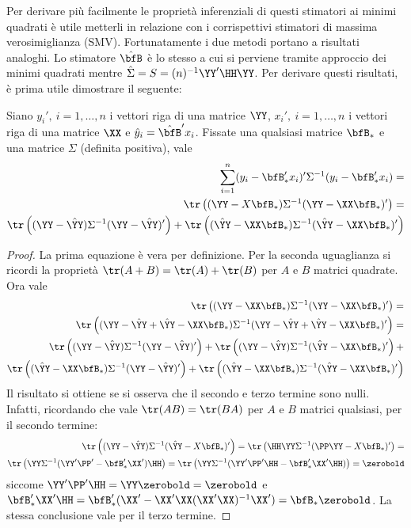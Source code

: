 \documentclass[]{article}
\begin{document}
Per derivare più facilmente le proprietà inferenziali di questi
stimatori ai minimi quadrati è utile metterli in relazione con i
corrispettivi stimatori di massima verosimiglianza (SMV). Fortunatamente
i due metodi portano a risultati analoghi. Lo stimatore \(\hat{\bfB}\) è
lo stesso a cui si perviene tramite approccio dei minimi quadrati mentre
\(\hat{\Sigma}=S=(n)^{-1}\YY'\HH\YY\). Per derivare questi risultati, è
prima utile dimostrare il seguente:

\begin{lemma}\label{decoScarti}
Siano $y_i',\ i=1,\ldots,n$ i vettori riga di una matrice $\YY$, $x_i',\ i=1,\ldots,n$ i vettori riga di una matrice $\XX$  e ${\hat y}_i=\hat{\bfB}'x_i$. Fissate una qualsiasi matrice $\bfB_*$ e una matrice $\Sigma$ (definita positiva), vale
\begin{eqnarray*}
\sum_{i=1}^n (y_i-\bfB_*' x_i)'\Sigma^{-1}(y_i-\bfB_*' x_i)=\\
\tr\left( (\YY-X\bfB_*)\Sigma^{-1}(\YY-\XX\bfB_*)' \right)=\\
\tr \left( (\YY-\hat{\YY})\Sigma^{-1}(\YY-\hat{\YY})' \right) + \tr\left( (\hat{\YY}-\XX\bfB_*)\Sigma^{-1}(\hat{\YY}-\XX\bfB_*)' 
\right)
\end{eqnarray*}
\end{lemma}
\begin{proof}
La prima equazione è vera per definizione.
Per la seconda uguaglianza si ricordi la proprietà $\tr(A+B)=\tr(A)+\tr(B)$ per $A$ e $B$ matrici quadrate. Ora vale
\begin{eqnarray*}
\tr\left((\YY-\XX\bfB_*)\Sigma^{-1}(\YY-\XX\bfB_*)'\right) =\\
\tr\left((\YY-\hat{\YY}+\hat{\YY}-\XX\bfB_*)\Sigma^{-1}(\YY-\hat{\YY}+\hat{\YY}-\XX\bfB_*)' \right)=\\
\tr\left((\YY-\hat{\YY})\Sigma^{-1}(\YY-\hat{\YY})'\right) +\tr\left((\YY-\hat{\YY})\Sigma^{-1}(\hat{\YY}-\XX\bfB_*)'\right)+\\
\tr\left((\hat{\YY}-\XX\bfB_*)\Sigma^{-1}(\YY-\hat{\YY})'\right) + \tr\left((\hat{\YY}-\XX\bfB_*)\Sigma^{-1}(\hat{\YY}-\XX\bfB_*)'\right)
\end{eqnarray*}
Il risultato si ottiene se si osserva che il secondo e terzo termine sono nulli. Infatti, 
ricordando che vale $\tr(AB)=\tr(BA)$ per $A$ e $B$ matrici qualsiasi, per il secondo termine:
\begin{eqnarray*}
\tr\left((\YY-\hat{\YY})\Sigma^{-1}(\hat{\YY}-X\bfB_*)'\right)=\tr\left(\HH \YY\Sigma^{-1}(\PP\YY-X\bfB_*)'\right)=\\
\tr\left(\YY\Sigma^{-1}(\YY'\PP'-\bfB_*'\XX')\HH \right)=\tr\left(\YY\Sigma^{-1}(\YY'\PP'\HH-\bfB_*'\XX'\HH) \right)=\zerobold
\end{eqnarray*}
siccome $\YY' \PP'\HH = \YY \zerobold=\zerobold$ e $\bfB_*'\XX'\HH = \bfB_*'(\XX' - \XX'\XX (\XX'\XX)^{-1} \XX')=\bfB_* \zerobold$.
La stessa conclusione vale per il terzo termine.
\end{proof}
\end{document}
